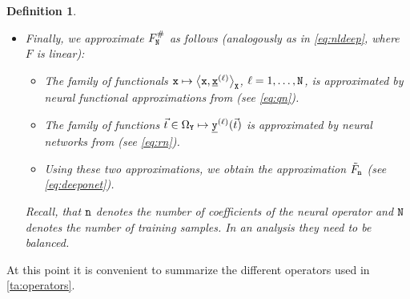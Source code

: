 \documentclass[10pt]{article}
\numberwithin{equation}{section}
\newtheorem{definition}[definition]{Definition}
\theoremstyle{nonumberplain}
\newcommand{\inner}[2]{\left<#1,#2\right>}
\newcommand{\X}{{\tt X}}
\newcommand{\Y}{{\tt Y}}
\newcommand{\y}{{\tt y}}
\newcommand{\n}{{\tt n}}
\newcommand{\x}{{\tt x}}
\newcommand{\ulx}{\underline{\x}}
\newcommand{\uly}{\underline{\y}}
\newcommand{\no}{{\tt N}}
\begin{document}
\begin{definition}
\begin{itemize}
   \item Finally, we approximate $F_\no^\#$ as follows (analogously as in \autoref{eq:nldeep}, where $F$ is linear):
          \begin{itemize}
          	\item The family of functionals $\x \mapsto \inner{\x}{\ulx^{(\ell)}}_\X$, $\ell=1,\dots,\no$,
          	      is approximated by neural functional approximations from \cite{CheChe93} (see \autoref{eq:qn}). 
          	\item The family of functions $\vec{t} \in \Omega_\Y \mapsto \uly^{(\ell)}(\vec{t})$ is approximated by neural networks from \cite{Cyb89} (see \autoref{eq:rn}).  
          	\item Using these two approximations, we obtain the approximation $\tilde{F}_\n$ (see \autoref{eq:deeponet}).
          \end{itemize} 
          Recall, that $\n$ denotes the number of coefficients of the neural operator and $\no$ denotes the number of training samples. In an analysis they need to be balanced.
\end{itemize}
\end{definition}
At this point it is convenient to summarize the different operators used in \autoref{ta:operators}.
\end{document}
